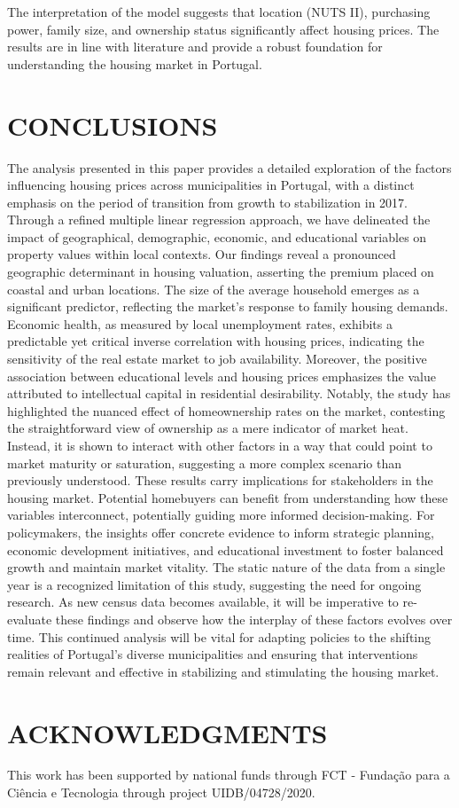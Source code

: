 \documentclass{aip-cp}
\begin{document}
The interpretation of the model suggests that location (NUTS II), purchasing power, family size, and ownership status significantly affect housing prices. The results are in line with literature and provide a robust foundation for understanding the housing market in Portugal.





\section{\uppercase{Conclusions}}

The analysis presented in this paper provides a detailed exploration of the factors influencing housing prices across municipalities in Portugal, with a distinct emphasis on the period of transition from growth to stabilization in 2017. Through a refined multiple linear regression approach, we have delineated the impact of geographical, demographic, economic, and educational variables on property values within local contexts.
Our findings reveal a pronounced geographic determinant in housing valuation, asserting the premium placed on coastal and urban locations. The size of the average household emerges as a significant predictor, reflecting the market's response to family housing demands. Economic health, as measured by local unemployment rates, exhibits a predictable yet critical inverse correlation with housing prices, indicating the sensitivity of the real estate market to job availability. Moreover, the positive association between educational levels and housing prices emphasizes the value attributed to intellectual capital in residential desirability.
Notably, the study has highlighted the nuanced effect of homeownership rates on the market, contesting the straightforward view of ownership as a mere indicator of market heat. Instead, it is shown to interact with other factors in a way that could point to market maturity or saturation, suggesting a more complex scenario than previously understood.
These results carry implications for stakeholders in the housing market. Potential homebuyers can benefit from understanding how these variables interconnect, potentially guiding more informed decision-making. For policymakers, the insights offer concrete evidence to inform strategic planning, economic development initiatives, and educational investment to foster balanced growth and maintain market vitality.
The static nature of the data from a single year is a recognized limitation of this study, suggesting the need for ongoing research. As new census data becomes available, it will be imperative to re-evaluate these findings and observe how the interplay of these factors evolves over time. This continued analysis will be vital for adapting policies to the shifting realities of Portugal's diverse municipalities and ensuring that interventions remain relevant and effective in stabilizing and stimulating the housing market.


\section{ACKNOWLEDGMENTS}
This work has been supported by national funds through FCT - Fundação para a Ciência e Tecnologia through project UIDB/04728/2020.


\nocite{*}
%
%
\end{document}

